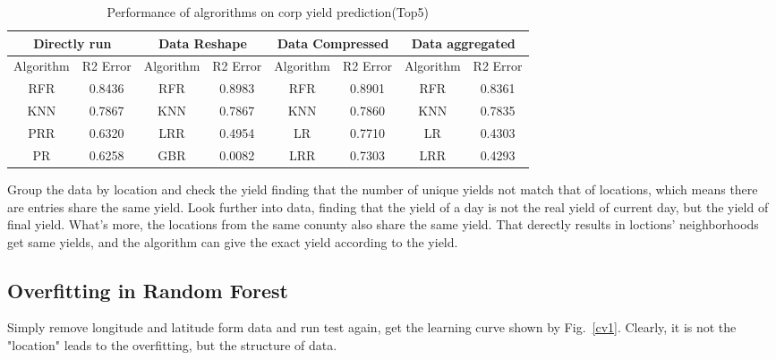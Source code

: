 \documentclass[conference]{IEEEtran}
\begin{document}
\begin{table}[htbp]
  \caption{Performance of algrorithms on corp yield prediction(Top5)}
  \begin{center}
    \begin{tabular}{|cc|cc|cc|cc|}
      \hline
      \multicolumn{2}{|c|}{Directly run}         & \multicolumn{2}{c|}{Data Reshape}         & \multicolumn{2}{c|}{Data Compressed}      & \multicolumn{2}{c|}{Data aggregated}      \\ \hline
      \multicolumn{1}{|c|}{Algorithm} & R2 Error & \multicolumn{1}{c|}{Algorithm} & R2 Error & \multicolumn{1}{c|}{Algorithm} & R2 Error & \multicolumn{1}{c|}{Algorithm} & R2 Error \\ \hline
      RFR                             & 0.8436   & RFR                            & 0.8983   & RFR                            & 0.8901   & RFR                            & 0.8361   \\
      KNN                             & 0.7867   & KNN                            & 0.7867   & KNN                            & 0.7860   & KNN                            & 0.7835   \\
      PRR                             & 0.6320   & LRR                            & 0.4954   & LR                             & 0.7710   & LR                             & 0.4303   \\
      PR                              & 0.6258   & GBR                            & 0.0082   & LRR                            & 0.7303   & LRR                            & 0.4293   \\ \hline
      \end{tabular}
  \label{tab:result}
  \end{center}
\end{table}


Group the data by location and check the yield finding that the number of unique yields not match that of locations, which means there are entries share the same yield. Look further into data, finding that the yield of a day is not the real yield of current day, but the yield of final yield. What's more, the locations from the same conunty also share the same yield. That derectly results in loctions' neighborhoods get same yields, and the algorithm can give the exact yield according to the yield. 

\subsection{Overfitting in Random Forest}
Simply remove longitude and latitude form data and run test again, get the learning curve shown by Fig.~\ref{cv1}. Clearly, it is not the "location" leads to the overfitting, but the structure of data.
\end{document}
